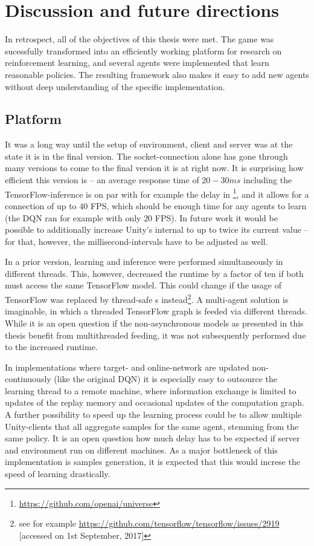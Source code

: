 \chapter{Discussion and future directions}

In retrospect, all of the objectives of this thesis were met. The game was sucessfully transformed into an efficiently working platform for research on reinforcement learning, and several agents were implemented that learn reasonable policies. The resulting framework also makes it easy to add new agents without deep understanding of the specific implementation.

\section{Platform}

It was a long way until the setup of environment, client and server was at the state it is in the final version. The socket-connection alone has gone through many versions to come to the final version it is at right now. It is surprising how efficient this version is -- an average response time of $20-30ms$ including the TensorFlow-inference is on par with for example the delay in \footnote{\url{https://github.com/openai/universe}}, and it allows for a connection of up to $40$ FPS, which should be enough time for any agents to learn (the DQN ran for example with only $20$ FPS). In future work it would be possible to additionally increase Unity's internal  to up to twice its current value -- for that, however, the millisecond-intervals have to be adjusted as well.

In a prior version, learning and inference were performed simultaneously in different threads. This, however, decreased the runtime by a factor of ten if both must access the same TensorFlow model. This could change if the usage of TensorFlow  was  replaced by thread-safe s instead\footnote{see for example \url{https://github.com/tensorflow/tensorflow/issues/2919} [accessed on 1st September, 2017]}. A multi-agent solution is imaginable, in which a threaded TensorFlow graph is feeded via different threads. While it is an open question if the non-asynchronous models as presented in this thesis benefit from multithreaded feeding, it was not subsequently performed due to the increased runtime. 

In implementations where target- and online-network are updated non-continuously (like the original DQN) it is especially easy to outsource the learning thread to a remote machine, where information exchange is limited to updates of the replay memory and occasional updates of the computation graph. A further possibility to speed up the learning process could be to allow multiple Unity-clients that all aggregate samples for the same agent, stemming from the same policy. It is an open question how much delay has to be expected if server and environment run on different machines. As a major bottleneck of this implementation is samples generation, it is expected that this would increse the speed of learning drastically.

